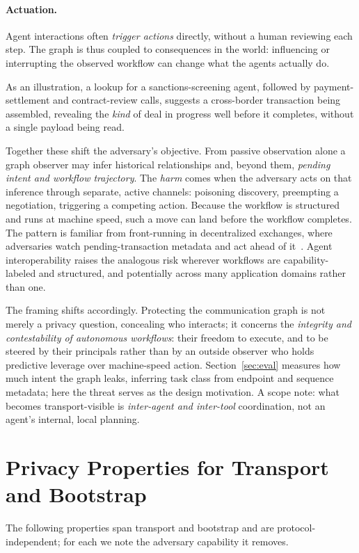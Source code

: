 \documentclass[10pt,twocolumn]{article}
\theoremstyle{definition}
\begin{document}
\paragraph{Actuation.} Agent interactions often \emph{trigger actions} directly,
without a human reviewing each step. The graph is thus coupled to consequences in
the world: influencing or interrupting the observed workflow can change what the
agents actually do.

As an illustration, a lookup for a sanctions-screening agent, followed by
payment-settlement and contract-review calls, suggests a cross-border transaction
being assembled, revealing the \emph{kind} of deal in progress well before it
completes, without a single payload being read.

Together these shift the adversary's objective. From passive observation alone a
graph observer may infer historical relationships and, beyond them, \emph{pending
intent and workflow trajectory}. The \emph{harm} comes when the adversary acts on
that inference through separate, active channels: poisoning discovery, preempting a
negotiation, triggering a competing action. Because the workflow is structured and
runs at machine speed, such a move can land before the workflow completes. The
pattern is familiar from front-running in decentralized exchanges, where adversaries
watch pending-transaction metadata and act ahead of it~\citep{flashboys}. Agent
interoperability raises the analogous risk wherever workflows are capability-labeled
and structured, and potentially across many application domains rather than one.

The framing shifts accordingly. Protecting the communication graph is not merely a
privacy question, concealing who interacts; it concerns the \emph{integrity and contestability
of autonomous workflows}: their freedom to execute, and to be steered by their
principals rather than by an outside observer who holds predictive leverage over
machine-speed action. Section~\ref{sec:eval} measures how much intent the graph
leaks, inferring task class from endpoint and sequence metadata; here the threat
serves as the design motivation. A scope note: what becomes transport-visible is
\emph{inter-agent and inter-tool} coordination, not an agent's internal, local
planning.

\section{Privacy Properties for Transport and Bootstrap}\label{sec:properties}
The following properties span transport and bootstrap and are protocol-independent;
for each we note the adversary capability it removes.
\end{document}
